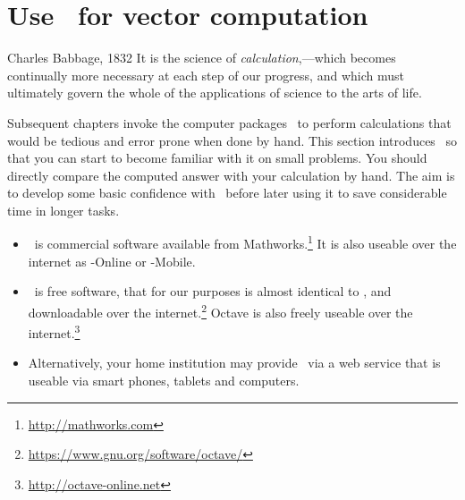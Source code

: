

\section{Use \script\ for vector computation}
\label{sec:umovc}
\secttoc


\begin{quoted}{Charles Babbage, 1832}
It is the science of \emph{calculation},---which becomes continually more necessary at each step of our progress, and which must ultimately govern the whole of the applications of science to the arts of life.
\end{quoted}

Subsequent chapters invoke the computer packages \script\ to perform calculations that would be tedious and error prone when done by hand.
This section introduces \script\ so that you can start to become familiar with it on small problems.
You should directly compare the computed answer with your calculation by hand.
The aim is to develop some basic confidence with \script\ before later using it to save considerable time in longer tasks.

\begin{itemize}
\item  \script[1]\ is commercial software available from Mathworks.\footnote{\url{http://mathworks.com}}
It is also useable over the internet as \script[1]-Online or \script[1]-Mobile.
\item \script[2]\ is free software, that for our purposes is almost identical to \script[1], and downloadable over the internet.\footnote{\url{https://www.gnu.org/software/octave/}}
Octave is also freely useable over the internet.\footnote{\url{http://octave-online.net}} 
\item Alternatively, your home institution may provide \script\ via a web service that is useable via smart phones, tablets and computers.
\end{itemize}



\begin{comment}
Avoid plotting because I do not want to confuse a vector with a row vector of plot points.  Plotting is also not high priority.
\end{comment}




